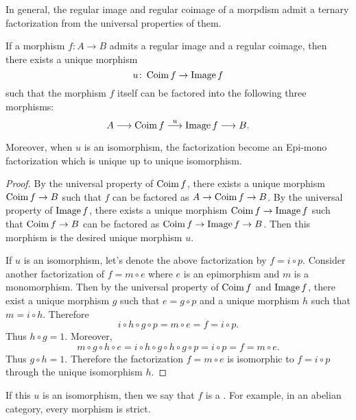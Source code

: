   In general, the regular image and regular coimage of a morpdism admit a ternary factorization from the universal properties of them.
  \begin{thm}\label{thm:ternary factorization}
    If a morphism $f\colon A\to B$ admits a regular image and a regular coimage, then there exists a unique morphism
    \begin{equation*}
      u\colon\operatorname{Coim}{f}\to\operatorname{Image}{f}
    \end{equation*}
    such that the morphism $f$ itself can be factored into the following three morphisms:
    \begin{equation*}
      A \longrightarrow \operatorname{Coim}{f} \stackrel{{u}}{\longrightarrow} \operatorname{Image}{f} \longrightarrow B.
    \end{equation*}

    Moreover, when $u$ is an isomorphism, the factorization become an Epi-mono factorization which is unique up to unique isomorphism.
  \end{thm}
  \begin{proof}
    By the universal property of $\operatorname{Coim}{f}$, there exists a unique morphism $\operatorname{Coim}{f}\to B$ such that $f$ can be factored as $A\to\operatorname{Coim}{f}\to B$. By the universal property of $\operatorname{Image}{f}$, there exists a unique morphism $\operatorname{Coim}{f}\to \operatorname{Image}{f}$ such that $\operatorname{Coim}{f}\to B$ can be factored as $\operatorname{Coim}{f}\to\operatorname{Image}{f}\to B$. Then this morphism is the desired unique morphism $u$.

    If $u$ is an isomorphism, let's denote the above factorization by $f = i\circ p$. Consider another factorization of $f = m\circ e$ where $e$ is an epimorphism and $m$ is a monomorphism. Then by the universal property of $\operatorname{Coim}{f}$ and $\operatorname{Image}{f}$, there exist a unique morphism $g$ such that $e = g\circ p$ and a unique morphism $h$ such that $m = i\circ h$. Therefore
    \begin{equation*}
      i\circ h\circ g\circ p = m\circ e = f = i\circ p.
    \end{equation*}
    Thus $h\circ g = 1$.
    Moreover,
    \begin{equation*}
      m\circ g\circ h\circ e = i\circ h\circ g\circ h\circ g\circ p = i\circ p = f = m\circ e.
    \end{equation*}
    Thus $g\circ h = 1$. Therefore the factorization $f = m\circ e$ is isomorphic to $f = i\circ p$ through the unique isomorphism $h$.
  \end{proof}
  If this $u$ is an isomorphism, then we say that $f$ is a .  For example, in an abelian category, every morphism is strict.

